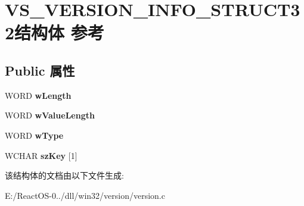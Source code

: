 \hypertarget{struct_v_s___v_e_r_s_i_o_n___i_n_f_o___s_t_r_u_c_t32}{}\section{V\+S\+\_\+\+V\+E\+R\+S\+I\+O\+N\+\_\+\+I\+N\+F\+O\+\_\+\+S\+T\+R\+U\+C\+T32结构体 参考}
\label{struct_v_s___v_e_r_s_i_o_n___i_n_f_o___s_t_r_u_c_t32}
\subsection*{Public 属性}
\begin{DoxyCompactItemize}
\item 
\mbox{\label{struct_v_s___v_e_r_s_i_o_n___i_n_f_o___s_t_r_u_c_t32_a489e1be2a299bd21d7254f22c21a795d}} 
W\+O\+RD {\bfseries w\+Length}
\item 
\mbox{\label{struct_v_s___v_e_r_s_i_o_n___i_n_f_o___s_t_r_u_c_t32_af9c888fc674fb7ee74717cd27881c0b4}} 
W\+O\+RD {\bfseries w\+Value\+Length}
\item 
\mbox{\label{struct_v_s___v_e_r_s_i_o_n___i_n_f_o___s_t_r_u_c_t32_a50ac1c8d5747c890d6b0b2fc5292be00}} 
W\+O\+RD {\bfseries w\+Type}
\item 
\mbox{\label{struct_v_s___v_e_r_s_i_o_n___i_n_f_o___s_t_r_u_c_t32_ae89ee63ec01ce348ed678603b4194322}} 
W\+C\+H\+AR {\bfseries sz\+Key} \mbox{[}1\mbox{]}
\end{DoxyCompactItemize}


该结构体的文档由以下文件生成\+:\begin{DoxyCompactItemize}
\item 
E\+:/\+React\+O\+S-\/0../dll/win32/version/version.\+c\end{DoxyCompactItemize}
